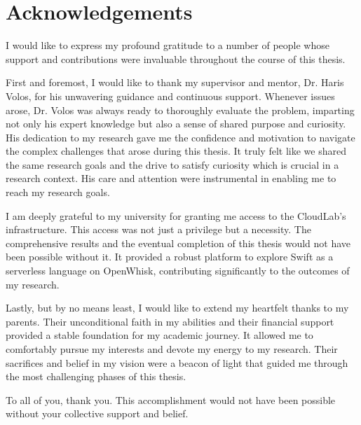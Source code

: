 \chapter*{Acknowledgements}

I would like to express my profound gratitude to a number of people whose support and contributions were invaluable throughout the course of this thesis.

First and foremost, I would like to thank my supervisor and mentor, Dr. Haris Volos, for his unwavering guidance and continuous support. Whenever issues arose, Dr. Volos was always ready to thoroughly evaluate the problem, imparting not only his expert knowledge but also a sense of shared purpose and curiosity. His dedication to my research gave me the confidence and motivation to navigate the complex challenges that arose during this thesis. It truly felt like we shared the same research goals and the drive to satisfy curiosity which is crucial in a research context. His care and attention were instrumental in enabling me to reach my research goals.

I am deeply grateful to my university for granting me access to the CloudLab's infrastructure. This access was not just a privilege but a necessity. The comprehensive results and the eventual completion of this thesis would not have been possible without it. It provided a robust platform to explore Swift as a serverless language on OpenWhisk, contributing significantly to the outcomes of my research.

Lastly, but by no means least, I would like to extend my heartfelt thanks to my parents. Their unconditional faith in my abilities and their financial support provided a stable foundation for my academic journey. It allowed me to comfortably pursue my interests and devote my energy to my research. Their sacrifices and belief in my vision were a beacon of light that guided me through the most challenging phases of this thesis.

To all of you, thank you. This accomplishment would not have been possible without your collective support and belief.

